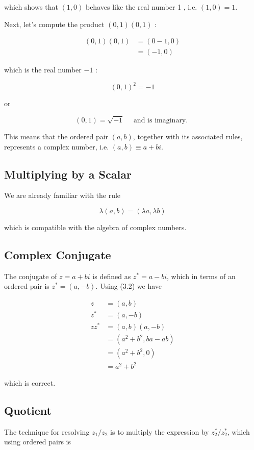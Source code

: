 which shows that $(1,0)$ behaves like the real number 1 , i.e. $(1,0)=1$.

Next, let's compute the product $(0,1)(0,1)$ :

$$
\begin{aligned}
(0,1)(0,1) & =(0-1,0) \\
& =(-1,0)
\end{aligned}
$$

which is the real number $-1$ :

$$
(0,1)^{2}=-1
$$

or

$$
(0,1)=\sqrt{-1} \quad \text { and is imaginary. }
$$

This means that the ordered pair $(a, b)$, together with its associated rules, represents a complex number, i.e. $(a, b) \equiv a+b i$.

\subsection{Multiplying by a Scalar}
We are already familiar with the rule

$$
\lambda(a, b)=(\lambda a, \lambda b)
$$

which is compatible with the algebra of complex numbers.

\subsection{Complex Conjugate}
The conjugate of $z=a+b i$ is defined as $z^{*}=a-b i$, which in terms of an ordered pair is $z^{*}=(a,-b)$. Using (3.2) we have

$$
\begin{aligned}
z & =(a, b) \\
z^{*} & =(a,-b) \\
z z^{*} & =(a, b)(a,-b) \\
& =\left(a^{2}+b^{2}, b a-a b\right) \\
& =\left(a^{2}+b^{2}, 0\right) \\
& =a^{2}+b^{2}
\end{aligned}
$$

which is correct.

\subsection{Quotient}
The technique for resolving $z_{1} / z_{2}$ is to multiply the expression by $z_{2}^{*} / z_{2}^{*}$, which using ordered pairs is

